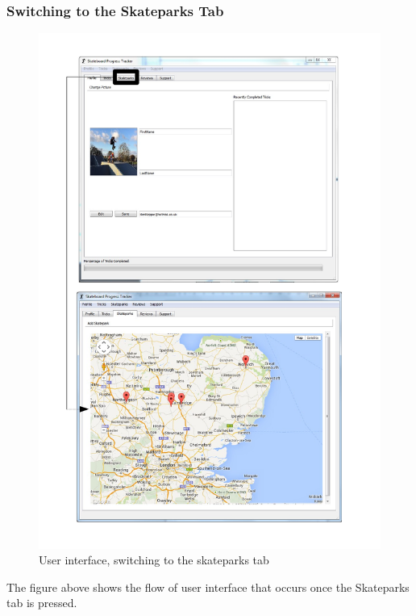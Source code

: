\subsubsection{Switching to the Skateparks Tab}
\begin{figure}[H]
    \includegraphics[width=\textwidth]{./Maintenance/Figures/SkateparkTab.pdf}
    \caption{User interface, switching to the skateparks tab} \label{fig:Skatepark Tab UI}
\end{figure}

The figure above shows the flow of user interface that occurs once the Skateparks tab is pressed.


